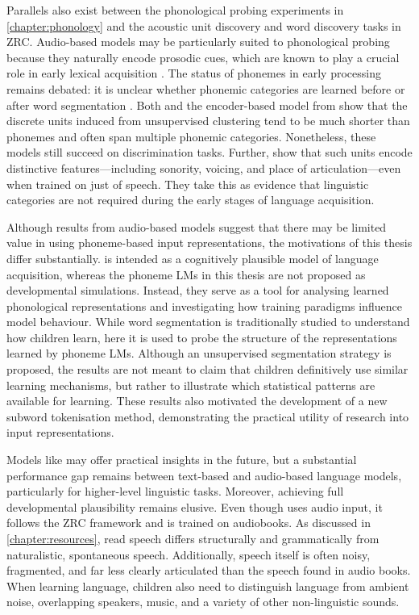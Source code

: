 Parallels also exist between the phonological probing experiments in \cref{chapter:phonology} and the acoustic unit discovery and word discovery tasks in ZRC. Audio-based models may be particularly suited to phonological probing because they naturally encode prosodic cues, which are known to play a crucial role in early lexical acquisition \citep{Cutler1987, Jusczyk1993stress, jusczyk-1999-stress-voice}. The status of phonemes in early processing remains debated: it is unclear whether phonemic categories are learned before or after word segmentation \citep{kazanina2018phonemes, matusevych2023infant}. Both \stela and the encoder-based model from \citet{schatz2021early} show that the discrete units induced from unsupervised clustering tend to be much shorter than phonemes and often span multiple phonemic categories. Nonetheless, these models still succeed on discrimination tasks. Further, \citet{lavechin2025simulating} show that such units encode distinctive features—including sonority, voicing, and place of articulation—even when trained on just  of speech. They take this as evidence that linguistic categories are not required during the early stages of language acquisition.

Although results from audio-based models suggest that there may be limited value in using phoneme-based input representations, the motivations of this thesis differ substantially. \stela is intended as a cognitively plausible model of language acquisition, whereas the phoneme LMs in this thesis are not proposed as developmental simulations. Instead, they serve as a tool for analysing learned phonological representations and investigating how training paradigms influence model behaviour. While word segmentation is traditionally studied to understand how children learn, here it is used to probe the structure of the representations learned by phoneme LMs. Although an unsupervised segmentation strategy is proposed, the results are not meant to claim that children definitively use similar learning mechanisms, but rather to illustrate which statistical patterns are available for learning. These results also motivated the development of a new subword tokenisation method, demonstrating the practical utility of research into input representations.

Models like \stela may offer practical insights in the future, but a substantial performance gap remains between text-based and audio-based language models, particularly for higher-level linguistic tasks. Moreover, achieving full developmental plausibility remains elusive. Even though \stela uses audio input, it follows the ZRC framework and is trained on audiobooks. As discussed in \cref{chapter:resources}, read speech differs structurally and grammatically from naturalistic, spontaneous speech. Additionally, speech itself is often noisy, fragmented, and far less clearly articulated than the speech found in audio books. When learning language, children also need to distinguish language from ambient noise, overlapping speakers, music, and a variety of other non-linguistic sounds.

